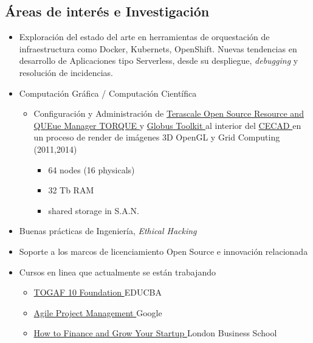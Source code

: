 \documentclass[overlapped,line,final]{../../templates/MichaelDeCorteCV/lib/res}
\begin{document}
\begin{resume}
\section{\sc Áreas de interés e Investigación}
\vspace{0.5cm}
\begin{itemize}
	\item Exploración del estado del arte en herramientas de orquestación de infraestructura como Docker, Kubernets, OpenShift. Nuevas tendencias en desarrollo de Aplicaciones tipo Serverless, desde su despliegue, \textit{debugging} y resolución de incidencias.
    \item Computación Gráfica / Computación Científica
	    \begin{itemize}		
		\item Configuración y Administración de \href {https://github.com/adaptivecomputing/torque#torque-resource-manager}{Terascale Open Source Resource and QUEue Manager TORQUE } y \href{https://toolkit.globus.org/}{Globus Toolkit } al interior del \href{https://cecad.udistrital.edu.co/}{CECAD } en un proceso de render de imágenes 3D OpenGL y Grid Computing (2011,2014)
	 \begin{itemize}
	  \item 64 nodes (16 physicals)
	  \item 32 Tb RAM
	  \item shared storage in S.A.N.
	 \end{itemize}
	\end{itemize}
    \item Buenas prácticas de Ingeniería, \textit{Ethical Hacking}
	\item Soporte a los marcos de licenciamiento Open Source e innovación relacionada
	\item Cursos en linea que actualmente se están trabajando
		\begin{itemize}
			\item \href{https://www.coursera.org/learn/togaf-10-foundation}{TOGAF 10 Foundation } EDUCBA			
			\item \href{https://www.coursera.org/learn/agile-project-management}{Agile Project Management } Google
			\item \href{https://www.coursera.org/learn/startup-financing-without-vc/}{How to Finance and Grow Your Startup } London Business School

\end{itemize}
\end{itemize}
\end{resume}
\end{document}
